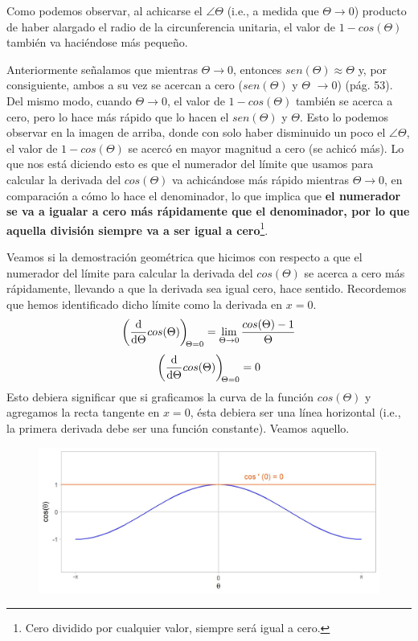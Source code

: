 \documentclass[12pt]{article}
\begin{document}
Como podemos observar, al achicarse el $\angle \Theta$ (i.e., a medida que $\Theta \to 0$) producto de haber alargado el radio de la circunferencia unitaria, el valor de $1 - cos(\Theta)$ también va haciéndose más pequeño. 

Anteriormente señalamos que mientras $\Theta \to 0$, entonces $sen(\Theta) \approx \Theta$ y, por consiguiente, ambos a su vez se acercan a cero ($sen(\Theta)$ y $\Theta$ $\to 0$) (pág. 53). Del mismo modo, cuando $\Theta \to 0$, el valor de $1 - cos(\Theta)$ también se acerca a cero, pero lo hace más rápido que lo hacen el $sen(\Theta)$ y $\Theta$. Esto lo podemos observar en la imagen de arriba, donde con solo haber disminuido un poco el $\angle \Theta$, el valor de $1 - cos(\Theta)$ se acercó en mayor magnitud a cero (se achicó más). Lo que nos está diciendo esto es que el numerador del límite que usamos para calcular la derivada del $cos(\Theta)$ va achicándose más rápido mientras $\Theta \to 0$, en comparación a cómo lo hace el denominador, lo que implica que \textbf{el numerador se va a igualar a cero más rápidamente que el denominador, por lo que aquella división siempre va a ser igual a cero}\footnote{Cero dividido por cualquier valor, siempre será igual a cero.}.

\newpage

Veamos si la demostración geométrica que hicimos con respecto a que el numerador del límite para calcular la derivada del $cos(\Theta)$ se acerca a cero más rápidamente, llevando a que la derivada sea igual cero, hace sentido. Recordemos que hemos identificado dicho límite como la derivada en $x = 0$.
\[\diff*{cos(\Theta)}\Theta[\Theta = 0] = \lim_{\Theta \to 0} \frac{cos(\Theta) - 1}{\Theta}\]
\[\diff*{cos(\Theta)}\Theta[\Theta = 0] = 0\]
Esto debiera significar que si graficamos la curva de la función $cos(\Theta)$ y agregamos la recta tangente en $x = 0$, ésta debiera ser una línea horizontal (i.e., la primera derivada debe ser una función constante). Veamos aquello.

\begin{figure}[hbt!]
\centering
\includegraphics[scale=0.7]{img/deriv_cos_theta.jpg}
\end{figure}
\end{document}
